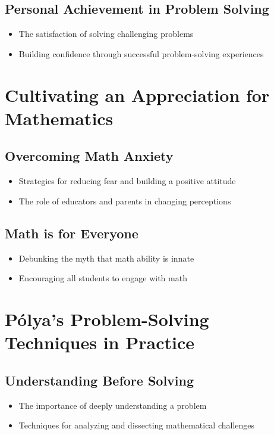 \documentclass{book}
\begin{document}
\subsection{Personal Achievement in Problem Solving}
\begin{itemize}
        \item The satisfaction of solving challenging problems
        \item Building confidence through successful problem-solving experiences
\end{itemize}


\section{Cultivating an Appreciation for Mathematics}
\subsection{Overcoming Math Anxiety}
\begin{itemize}
        \item Strategies for reducing fear and building a positive attitude
        \item The role of educators and parents in changing perceptions
\end{itemize}
\subsection{Math is for Everyone}
\begin{itemize}
        \item Debunking the myth that math ability is innate
        \item Encouraging all students to engage with math
\end{itemize}


\section{Pólya's Problem-Solving Techniques in Practice}
\subsection{Understanding Before Solving}
\begin{itemize}
        \item The importance of deeply understanding a problem
        \item Techniques for analyzing and dissecting mathematical challenges
\end{itemize}
\end{document}

